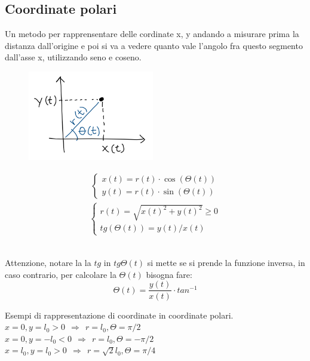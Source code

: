 \subsection{Coordinate polari}
Un metodo per rapprensentare delle cordinate x, y andando a misurare prima la distanza dall'origine e poi si va a vedere
quanto vale l'angolo fra questo segmento dall'asse x, utilizzando seno e coseno.
\begin{figure}
    \centering
    \includegraphics[width=5.5cm]{images/coordinate-polari.png}
\end{figure}
\begin{align*}
    \begin{cases}
        x(t) = r(t) \cdot \cos(\Theta(t))\\
        y(t) = r(t) \cdot \sin(\Theta(t)) 
    \end{cases}
\end{align*}
\begin{align*}
    \begin{cases}
        r(t) = \sqrt{x(t)^2 + y(t)^2} \geq 0\\
        tg(\Theta(t)) = y(t) / x(t) 
    \end{cases}
\end{align*}
\\
\begin{note}
    Attenzione, notare la la $tg$ in $tg\Theta(t)$ si mette se si prende la funzione inversa, in caso contrario, per calcolare la 
    $\Theta(t)$ bisogna fare:
    $$\Theta(t) = \frac{y(t)}{x(t)} \cdot tan^{-1}$$
\end{note}
\begin{example} Esempi di rappresentazione di coordinate in coordinate polari.\\
    $x = 0, y = l_0 > 0 \:\: \Rightarrow \:\: r = l_0, \Theta = \pi/2$\\
    $x = 0, y = -l_0 < 0 \:\: \Rightarrow \:\: r = l_0, \Theta = -\pi/2$\\
    $x = l_0, y = l_0 > 0 \:\: \Rightarrow \:\: r = \sqrt{2}l_0, \Theta = \pi/4$\\
\end{example}

